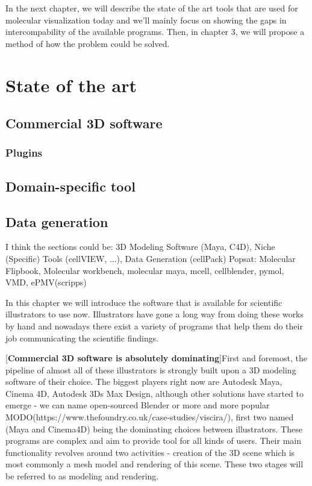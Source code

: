 \documentclass[
  digital, %
  table,   %
  nolof,     %
  nolot,     %
]{fithesis3}
\begin{document}
In the next chapter, we will describe the state of the art tools that are used for molecular visualization today and we'll mainly focus on showing the gaps in intercompability of the available programs. Then, in chapter 3, we will propose a method of how the problem could be solved.

\chapter{State of the art}
\section{Commercial 3D software}
\subsection{Plugins}
\section{Domain-specific tool}
\section{Data generation}
I think the sections could be: 3D Modeling Software (Maya, C4D), Niche (Specific) Tools (cellVIEW, ...), Data Generation (cellPack)
Popsat: Molecular Flipbook, Molecular workbench, molecular maya, mcell, cellblender, pymol, VMD, ePMV(scripps)

In this chapter we will introduce the software that is available for scientific illustrators to use now. Illustrators have gone a long way from doing these works by hand and nowadays there exist a variety of programs that help them do their job communicating the scientific findings.

[\textbf{Commercial 3D software is absolutely dominating}]First and foremost, the pipeline of almost all of these illustrators is strongly built upon a 3D modeling software of their choice. The biggest players right now are Autodesk Maya, Cinema 4D, Autodesk 3Ds Max Design, although other solutions have started to emerge - we can name open-sourced Blender or more and more popular MODO(https://www.thefoundry.co.uk/case-studies/viscira/), first two named (Maya and Cinema4D) being the dominating choices between illustrators. These programs are complex and aim to provide tool for all kinds of users. Their main functionality revolves around two activities - creation of the 3D scene which is most commonly a mesh model and rendering of this scene. These two stages will be referred to as modeling and rendering.
\end{document}
